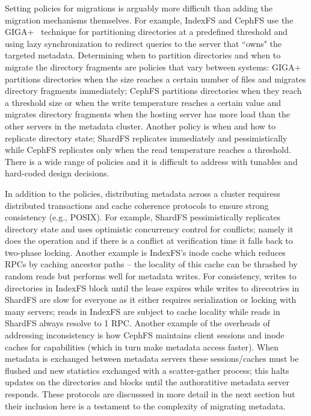 \documentclass[preprint]{sigplanconf-eurosys}
\begin{document}
Setting policies for migrations is arguably more difficult than adding the
migration mechanisms themselves.  For example, IndexFS and CephFS use the
GIGA+~\cite{GIGA+} technique for partitioning directories at a predefined
threshold and using lazy synchronization to redirect queries to the server that
``owns" the targeted metadata.  Determining when to partition directories and
when to migrate the directory fragments are policies that vary between systems:
GIGA+ partitions directories when the size reaches a certain number of files
and migrates directory fragments immediately; CephFS partitions directories
when they reach a threshold size or when the write temperature reaches a
certain value and migrates directory fragments when the hosting server has more
load than the other servers in the metadata cluster. Another policy is when and
how to replicate directory state; ShardFS replicates immediately and
pessimistically while CephFS replicates only when the read temperature reaches
a threshold.  There is a wide range of policies and it is difficult to address
with tunables and hard-coded design decisions.

In addition to the policies, distributing metadata across a cluster requiress
distributed transactions and cache coherence protocols to ensure strong
consistency ({e.g.}, POSIX).  For example, ShardFS pessimistically replicates
directory state and uses optimistic concurrency control for conflicts; namely
it does the operation and if there is a conflict at verification time it falls
back to two-phase locking.  Another example is IndexFS's inode cache which
reduces RPCs by caching ancestor paths -- the locality of this cache can be
thrashed by random reads but performs well for metadata writes. For
consistency, writes to directories in IndexFS block until the lease expires
while writes to direcotries in ShardFS are slow for everyone as it either
requires serialization or locking with many servers; reads in IndexFS are
subject to cache locality while reads in ShardFS always resolve to 1 RPC.
Another example of the overheads of addressing inconsistency is how CephFS
maintains client sessions and inode caches for capabilities (which in turn make
metadata access faster). When metadata is exchanged between metadata servers
these sessions/caches must be flushed and new statistics exchanged with a
scatter-gather process; this halts updates on the directories and blocks until
the authoratitive metadata server responds.  These protocols are discusssed in
more detail in the next section but their inclusion here is a testament to the
complexity of migrating metadata.
\end{document}
